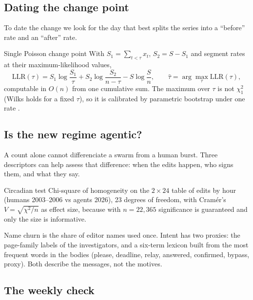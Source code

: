\documentclass[10pt,a4paper]{article}
\begin{document}
\subsection{Dating the change point}

To date the change we look for the day that best splits the series into a ``before'' rate and an ``after'' rate.
\begin{resbox}{Single Poisson change point}
With $S_1 = \sum_{t<\tau} x_t$, $S_2 = S - S_1$ and segment rates at their maximum-likelihood values,
$$\mathrm{LLR}(\tau) = S_1 \log\frac{S_1}{\tau} + S_2 \log\frac{S_2}{n-\tau} - S \log\frac{S}{n}, \qquad \hat\tau = \arg\max_\tau \mathrm{LLR}(\tau),$$
computable in $O(n)$ from one cumulative sum. The maximum over $\tau$ is not $\chi^2_1$ (Wilks holds for a fixed $\tau$), so it is calibrated by parametric bootstrap under one rate \citep[\S11.1]{cryer2008time}.
\end{resbox}

\subsection{Is the new regime agentic?}

A count alone cannot differenciate a swarm from a human burst. Three descriptors can help assess that difference: when the edits happen, who signs them, and what they say.
\begin{defbox}{Circadian test}
Chi-square of homogeneity on the $2 \times 24$ table of edits by hour (humans 2003--2006 vs agents 2026), 23 degrees of freedom, with Cram\'er's $V = \sqrt{\chi^2 / n}$ as effect size, because with $n = 22{,}365$ significance is guaranteed and only the size is informative.
\end{defbox}
Name churn is the share of editor names used once. Intent has two proxies: the page-family labels of the investigators, and a six-term lexicon built from the most frequent words in the bodies (please, deadline, relay, answered, confirmed, bypass, proxy). Both describe the messages, not the motives.

\subsection{The weekly check}
\end{document}
